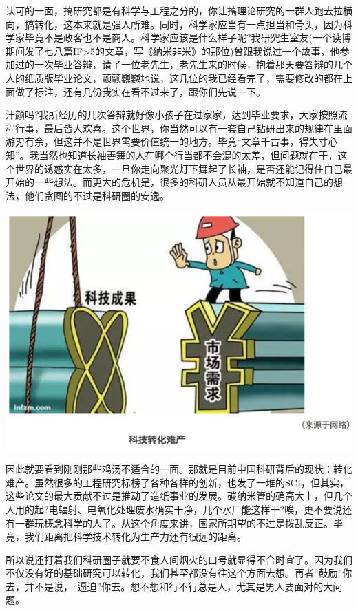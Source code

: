 \documentclass[
]{book}
\begin{document}
认可的一面，搞研究都是有科学与工程之分的，你让搞理论研究的一群人跑去拉横向，搞转化，这本来就是强人所难。同时，科学家应当有一点担当和骨头，因为科学家毕竟不是政客也不是商人。科学家应该是什么样子呢?我研究生室友(一个读博期间发了七八篇IF\textgreater5的文章，写《纳米非米》的那位)曾跟我说过一个故事，他参加过的一次毕业答辩，请了一位老先生，老先生来的时候，抱着那天要答辩的几个人的纸质版毕业论文，颤颤巍巍地说，这几位的我已经看完了，需要修改的都在上面做了标注，还有几份我实在看不过来了，跟你们先说一下。

汗颜吗?我所经历的几次答辩就好像小孩子在过家家，达到毕业要求，大家按照流程行事，最后皆大欢喜。这个世界，你当然可以有一套自己钻研出来的规律在里面游刃有余，但这并不是世界需要价值统一的地方。毕竟``文章千古事，得失寸心知''。我当然也知道长袖善舞的人在哪个行当都不会混的太差，但问题就在于，这个世界的诱惑实在太多，一旦你走向聚光灯下舞起了长袖，是否还能记得住自己最开始的一些想法。而更大的危机是，很多的科研人员从最开始就不知道自己的想法，他们贪图的不过是科研圈的安逸。

\includegraphics[width=8.33in]{images/kq2}

因此就要看到刚刚那些鸡汤不适合的一面。那就是目前中国科研背后的现状：转化难产。虽然很多的工程研究标榜了各种各样的创新，也发了一堆的SCI，但其实，这些论文的最大贡献不过是推动了造纸事业的发展。碳纳米管的确高大上，但几个人用的起?电辐射、电氧化处理废水确实干净，几个水厂能这样干?唉，更不要说还有一群玩概念科学的人了。从这个角度来讲，国家所期望的不过是拨乱反正。毕竟，我们距离把科学技术转化为生产力还有很远的距离。

所以说还打着我们科研圈子就要不食人间烟火的口号就显得不合时宜了。因为我们不仅没有好的基础研究可以转化，我们甚至都没有往这个方面去想。再者``鼓励''你去，并不是说，``逼迫''你去。想不想和行不行总是人，尤其是男人要面对的大问题。
\end{document}
